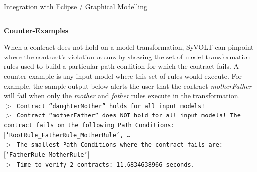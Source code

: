 \documentclass[final,hyperref={pdfpagelabels=false}]{beamer}
\begin{document}
\begin{frame}{}
\begin{block}{Integration with Eclipse / Graphical Modelling}
\begin{columns}[t,totalwidth=\linewidth]
\begin{column}{.585\linewidth}
        \begin{center}\textbf{Counter-Examples}\end{center}
        
      When a contract does not hold on a model
      transformation, SyVOLT can pinpoint where the contract's violation occurs by showing the set of model transformation rules used to build a particular path condition for which
      the contract fails. A counter-example is any input model where
      this set of rules would execute. For example, the sample output
      below alerts the user that the contract \textit{motherFather} will
      fail when only the \textit{mother} and \textit{father} rules execute in the
      transformation.\newline
      \footnotesize
      \texttt{
$>$ Contract ``daughterMother'' holds for all input models!\\
$>$ Contract ``motherFather'' does NOT hold for all input
models! The contract fails on the following Path Conditions:\\
$\lbrack$'RootRule\_FatherRule\_MotherRule', \dots$\rbrack$\\
$>$ The smallest Path Conditions where the contract fails are:\\
$\lbrack$'FatherRule\_MotherRule'$\rbrack$\\
$>$ Time to verify 2 contracts: 11.6834638966 seconds.
     }
                  

\end{column}
\end{columns}
\end{block}
\end{frame}
\end{document}
